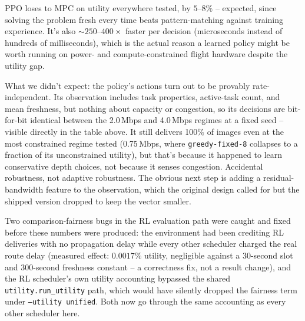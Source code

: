 PPO loses to MPC on utility everywhere tested, by $5$--$8\%$ -- expected, since solving the problem fresh every time beats pattern-matching against training experience. It's also $\sim 250$--$400\times$ faster per decision (microseconds instead of hundreds of milliseconds), which is the actual reason a learned policy might be worth running on power- and compute-constrained flight hardware despite the utility gap.

What we didn't expect: the policy's actions turn out to be provably rate-independent. Its observation includes task properties, active-task count, and mean freshness, but nothing about capacity or congestion, so its decisions are bit-for-bit identical between the 2.0\,Mbps and 4.0\,Mbps regimes at a fixed seed -- visible directly in the table above. It still delivers 100\% of images even at the most constrained regime tested (0.75\,Mbps, where \texttt{greedy-fixed-8} collapses to a fraction of its unconstrained utility), but that's because it happened to learn conservative depth choices, not because it senses congestion. Accidental robustness, not adaptive robustness. The obvious next step is adding a residual-bandwidth feature to the observation, which the original design called for but the shipped version dropped to keep the vector smaller.

Two comparison-fairness bugs in the RL evaluation path were caught and fixed before these numbers were produced: the environment had been crediting RL deliveries with no propagation delay while every other scheduler charged the real route delay (measured effect: $0.0017\%$ utility, negligible against a 30-second slot and 300-second freshness constant -- a correctness fix, not a result change), and the RL scheduler's own utility accounting bypassed the shared \texttt{utility.run\_utility} path, which would have silently dropped the fairness term under \texttt{--utility unified}. Both now go through the same accounting as every other scheduler here.

